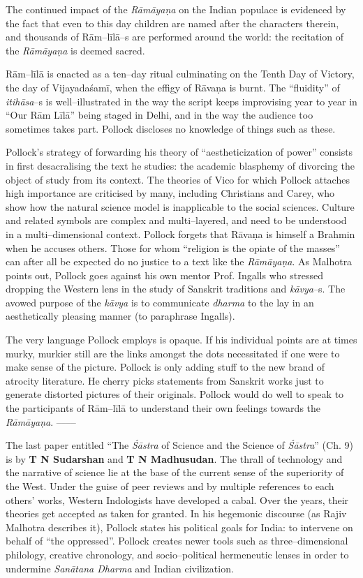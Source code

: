 The continued impact of the \textit{Rāmāyaṇa} on the Indian populace is evidenced by the fact that even to this day children are named after the characters therein, and thousands of Rām–līlā–s are performed around the world: the recitation of the \textit{Rāmāyaṇa} is deemed sacred.

Rām–līlā is enacted as a ten–day ritual culminating on the Tenth Day of Victory, the day of Vijayadaśamī, when the effigy of Rāvaṇa is burnt. The “fluidity” of \textit{itihāsa}–s is well–illustrated in the way the script keeps improvising year to year in “Our Rām Līlā” being staged in Delhi, and in the way the audience too sometimes takes part. Pollock discloses no knowledge of things such as these.

Pollock’s strategy of forwarding his theory of “aestheticization of power” consists in first desacralising the text he studies: the academic blasphemy of divorcing the object of study from its context. The theories of Vico for which Pollock attaches high importance are criticised by many, including Christians and Carey, who show how the natural science model is inapplicable to the social sciences. Culture and related symbols are complex and multi–layered, and need to be understood in a multi–dimensional context. Pollock forgets that Rāvaṇa is himself a Brahmin when he accuses others. Those for whom “religion is the opiate of the masses” can after all be expected do no justice to a text like the \textit{Rāmāyaṇa}. As Malhotra points out, Pollock goes against his own mentor Prof. Ingalls who stressed dropping the Western lens in the study of Sanskrit traditions and \textit{kāvya}–s. The avowed purpose of the \textit{kāvya} is to communicate \textit{dharma} to the lay in an aesthetically pleasing manner (to paraphrase Ingalls).

The very language Pollock employs is opaque. If his individual points are at times murky, murkier still are the links amongst the dots necessitated if one were to make sense of the picture. Pollock is only adding stuff to the new brand of atrocity literature. He cherry picks statements from Sanskrit works just to generate distorted pictures of their originals. Pollock would do well to speak to the participants of Rām–līlā to understand their own feelings towards the \textit{Rāmāyaṇa}. ––––

The last paper entitled “The \textit{Śāstra} of Science and the Science of \textit{Śāstra}” (Ch. 9) is by \textbf{T N Sudarshan} and \textbf{T N Madhusudan}. The thrall of technology and the narrative of science lie at the base of the current sense of the superiority of the West. Under the guise of peer reviews and by multiple references to each others’ works, Western Indologists have developed a cabal. Over the years, their theories get accepted as taken for granted. In his hegemonic discourse (as Rajiv Malhotra describes it), Pollock states his political goals for India: to intervene on behalf of “the oppressed”. Pollock creates newer tools such as three–dimensional philology, creative chronology, and socio–political hermeneutic lenses in order to undermine \textit{Sanātana Dharma} and Indian civilization.

